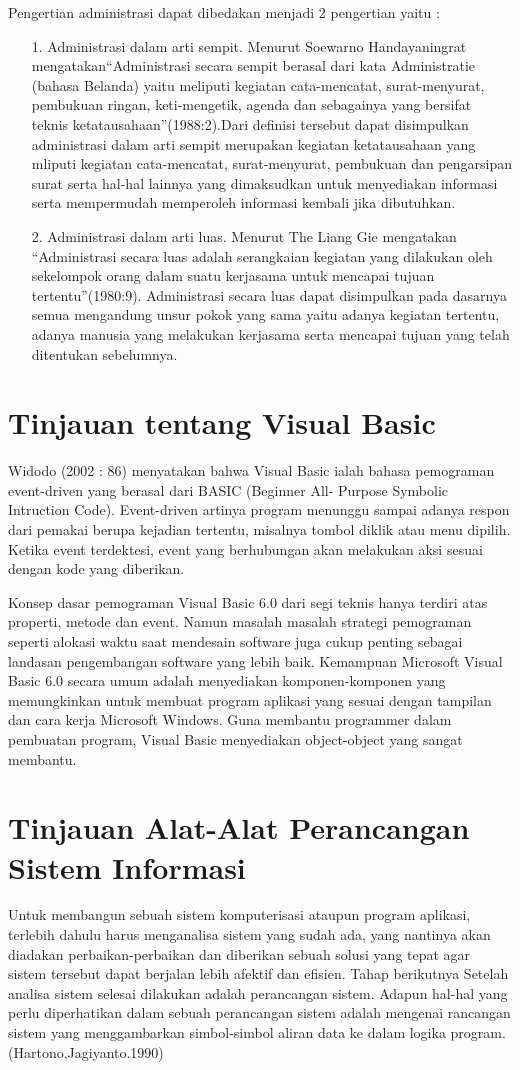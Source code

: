 \documentclass{jtetiproposalskripsi}
\begin{document}
Pengertian administrasi dapat dibedakan menjadi 2 pengertian yaitu :
\begin{itemize}
\item[1.] Administrasi dalam arti sempit. Menurut Soewarno Handayaningrat mengatakan“Administrasi secara sempit berasal dari kata Administratie (bahasa Belanda) yaitu meliputi kegiatan cata-mencatat, surat-menyurat, pembukuan ringan, keti-mengetik, agenda dan sebagainya yang bersifat teknis ketatausahaan”(1988:2).Dari definisi tersebut dapat disimpulkan administrasi dalam arti sempit merupakan kegiatan ketatausahaan yang mliputi kegiatan cata-mencatat, surat-menyurat, pembukuan dan pengarsipan surat serta hal-hal lainnya yang dimaksudkan untuk menyediakan informasi serta mempermudah memperoleh informasi kembali jika dibutuhkan.
\item[2.] Administrasi dalam arti luas. Menurut The Liang Gie mengatakan “Administrasi secara luas adalah serangkaian kegiatan yang dilakukan oleh sekelompok orang dalam suatu kerjasama untuk mencapai tujuan tertentu”(1980:9). Administrasi secara luas dapat disimpulkan pada dasarnya semua mengandung unsur pokok yang sama yaitu adanya kegiatan tertentu, adanya manusia yang melakukan kerjasama serta mencapai tujuan yang telah ditentukan sebelumnya.
\end{itemize}
\section{Tinjauan tentang Visual Basic}
Widodo (2002 : 86) menyatakan bahwa Visual Basic ialah bahasa pemograman event-driven yang berasal dari BASIC (Beginner All- Purpose Symbolic Intruction Code). Event-driven artinya program menunggu sampai adanya respon dari pemakai berupa kejadian tertentu, misalnya tombol diklik atau menu dipilih. Ketika event terdektesi, event yang berhubungan akan melakukan aksi sesuai dengan kode yang diberikan.

Konsep dasar pemograman Visual Basic 6.0 dari segi teknis hanya terdiri atas properti, metode dan event. Namun masalah masalah strategi pemograman seperti alokasi waktu saat mendesain software juga cukup penting sebagai landasan pengembangan software yang lebih baik. Kemampuan Microsoft Visual Basic 6.0 secara umum adalah menyediakan komponen-komponen yang memungkinkan untuk membuat program aplikasi yang sesuai dengan tampilan dan cara kerja Microsoft Windows. Guna membantu programmer dalam pembuatan program, Visual Basic menyediakan object-object yang sangat membantu.
\section{Tinjauan Alat-Alat Perancangan Sistem Informasi}
Untuk membangun sebuah sistem komputerisasi ataupun program aplikasi, terlebih dahulu harus menganalisa sistem yang sudah ada, yang nantinya akan diadakan perbaikan-perbaikan dan diberikan sebuah solusi yang tepat agar sistem tersebut dapat berjalan lebih afektif dan efisien. Tahap berikutnya Setelah analisa sistem selesai dilakukan adalah perancangan sistem. Adapun hal-hal yang perlu diperhatikan dalam sebuah perancangan sistem adalah mengenai rancangan sistem yang menggambarkan simbol-simbol aliran data ke dalam logika program.(Hartono,Jagiyanto.1990)
\end{document}
